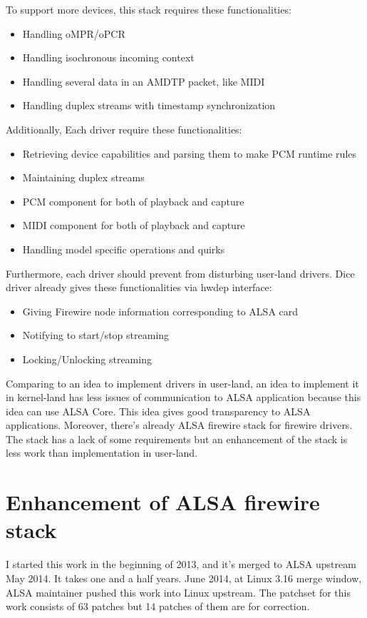 \documentclass[onecolumn]{article}
\begin{document}
To support more devices, this stack requires these functionalities:
\begin{itemize}
\item Handling oMPR/oPCR
\item Handling isochronous incoming context
\item Handling several data in an AMDTP packet, like MIDI
\item Handling duplex streams with timestamp synchronization
\end{itemize}

Additionally, Each driver require these functionalities:
\begin{itemize}
\item Retrieving device capabilities and parsing them to make PCM runtime rules
\item Maintaining duplex streams
\item PCM component for both of playback and capture
\item MIDI component for both of playback and capture
\item Handling model specific operations and quirks
\end{itemize}

Furthermore, each driver should prevent from disturbing user-land drivers. Dice driver already gives these functionalities via hwdep interface:
\begin{itemize}
\item Giving Firewire node information corresponding to ALSA card
\item Notifying to start/stop streaming
\item Locking/Unlocking streaming
\end{itemize}

Comparing to an idea to implement drivers in user-land, an idea to implement it in kernel-land has less issues of communication to ALSA application because this idea can use ALSA Core. This idea gives good transparency to ALSA applications. Moreover, there's already ALSA firewire stack for firewire drivers. The stack has a lack of some requirements but an enhancement of the stack is less work than implementation in user-land.


\section{Enhancement of ALSA firewire stack}

I started this work in the beginning of 2013, and it's merged to ALSA upstream May 2014. It takes one and a half years. June 2014, at Linux 3.16 merge window, ALSA maintainer pushed this work into Linux upstream. The patchset for this work consists of 63 patches but 14 patches of them are for correction.
\end{document}
